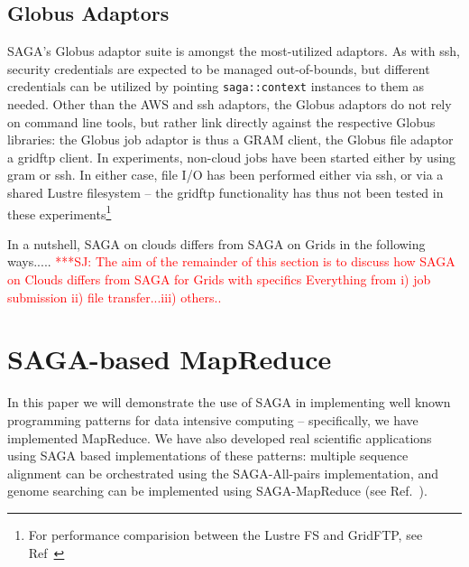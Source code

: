 \documentclass[conference,final]{IEEEtran}
\newcommand{\jhanote}[1]{ {\textcolor{red} { ***SJ: #1 }}}
\newcommand{\jhanote}[1]{}
\newcommand{\T}[1]{\texttt{#1}}
\begin{document}
\subsection{Globus Adaptors}
SAGA's Globus adaptor suite is amongst the most-utilized adaptors.  As
with ssh, security credentials are expected to be managed
out-of-bounds, but different credentials can be utilized by pointing
\T{saga::context} instances to them as needed.  Other than the AWS and
ssh adaptors, the Globus adaptors do not rely on command line tools,
but rather link directly against the respective Globus libraries: the
Globus job adaptor is thus a GRAM client, the Globus file adaptor a
gridftp client.  In experiments, non-cloud jobs have been started
either by using gram or ssh.  In either case, file I/O has been
performed either via ssh, or via a shared Lustre filesystem -- the
gridftp functionality has thus not been tested in these
experiments\footnote{For performance comparision between the Lustre FS
  and GridFTP, see Ref~\cite{saga_cc09}}

In a nutshell, SAGA on clouds differs from SAGA on Grids in the
following ways.....  \jhanote{The aim of the remainder of this section
  is to discuss how SAGA on Clouds differs from SAGA for Grids with
  specifics Everything from i) job submission ii) file transfer...iii)
  others..}

\section{SAGA-based MapReduce}
In this paper we will demonstrate the use of SAGA in implementing well
known programming patterns for data intensive computing --
specifically, we have implemented MapReduce. We have also developed
real scientific applications using SAGA based implementations of these
patterns: multiple sequence alignment can be orchestrated using the
SAGA-All-pairs implementation, and genome searching can be implemented
using SAGA-MapReduce (see Ref.~\cite{saga_cc09}).


\end{document}
